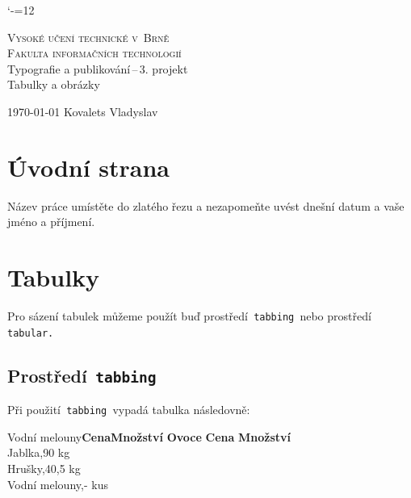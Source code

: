 \documentclass[a4paper, 11pt]{article}
\begin{document}
\catcode`-=12

\begin{titlepage}
\begin{center}

\Huge \textsc{Vysoké učení technické v~Brně}\\
\huge\textsc{Fakulta informačních technologií} \\
\LARGE Typografie a publikování\,--\,3. projekt \\
\Huge {Tabulky a obrázky} \\

\end{center}

{\Large\today \hfill
Kovalets Vladyslav}

\end{titlepage}

\newpage

\section{Úvodní strana}

Název práce umístěte do zlatého řezu a nezapomeňte uvést dnešní datum a vaše jméno a příjmení.

\section{Tabulky}

Pro sázení tabulek můžeme použít buď prostředí\texttt{ tabbing }nebo prostředí\texttt{  tabular. }

\subsection{Prostředí\texttt{ tabbing }}

Při použití\texttt{ tabbing }vypadá tabulka následovně:

\begin{tabbing}

Vodní melouny\quad \=\textbf{Cena}\quad \= \textbf{Množství}\quad\kill
\textbf{Ovoce}\> \textbf{Cena}\> \textbf{Množství}\\
Jablka,90 kg\\
Hrušky,40,5 kg\\
Vodní melouny,- kus\\
  
\end{tabbing}
\end{document}
